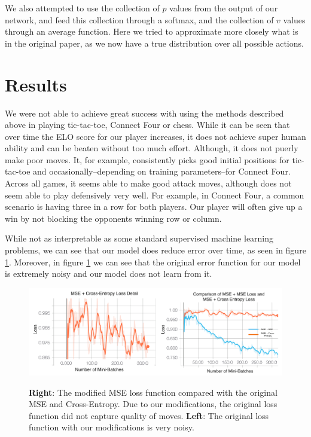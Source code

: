\documentclass[english]{article}
\begin{document}
We also attempted to use the collection of $p$ values from the output of our
network, and feed this collection through a softmax, and the collection of $v$
values through an average function. Here we tried to approximate more closely
what is in the original paper, as we now have a true distribution over all
possible actions.
\section{Results}

We were not able to achieve great success with using the methods described above
in playing tic-tac-toe, Connect Four or chess. While it can be seen that over
time the ELO score for our player increases, it does not achieve super human
ability and can be beaten without too much effort. Although, it does not puerly
make poor moves. It, for example, consistently picks good initial positions for
tic-tac-toe and occasionally--depending on training parameters--for Connect
Four. Across all games, it seems able to make good attack moves, although does
not seem able to play defensively very well. For example, in Connect Four, a
common scenario is having three in a row for both players. Our player will often
give up a win by not blocking the opponents winning row or column. 

While not as interpretable as some standard supervised machine learning
problems, we can see that our model does reduce error over time, as seen in
figure \ref{fig:lossMSE}. Moreover, in figure \ref{fig:lossMSE} we can see that the original
error function for our model is extremely noisy and our model does not learn
from it.

\begin{figure}
\centering
\includegraphics[width=\textwidth]{plots}
    \label{fig:lossMSE}
    \caption{\textbf{Right}: The modified MSE loss function compared with the original MSE and
    Cross-Entropy. Due to our modifications, the original loss function did not
    capture quality of moves. \textbf{Left}: The original loss function with our modifications is very noisy.}
\end{figure}
\end{document}
